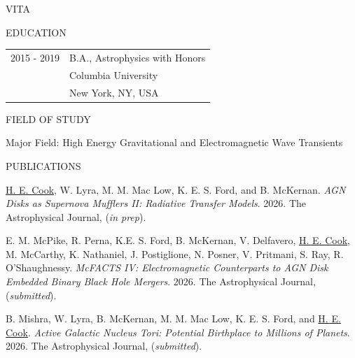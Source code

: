 \begin{center}
 VITA
\end{center}

\medskip

\begin{center}
EDUCATION
\end{center}


\begin{flushleft}
\begin{tabular}{ll}
 
2015 - 2019 &  B.A., Astrophysics with Honors \\
 & Columbia University \\
 & New York, NY, USA
\end{tabular}
\end{flushleft}

\medskip

\singlespace

\medskip

\begin{center}
FIELD OF STUDY
\end{center}
\begin{flushleft}
Major Field: High Energy Gravitational and Electromagnetic Wave Transients
\end{flushleft}

\begin{center}
PUBLICATIONS %
\end{center}

\hangindent=0.5in \noindent \underline{H. E. Cook}, W. Lyra, M. M. Mac Low, K. E. S. Ford, and B. McKernan. \textit{AGN Disks as Supernova Mufflers II: Radiative Transfer Models}. 2026. The Astrophysical Journal, (\textit{in prep}).

\hangindent=0.5in \noindent E. M. McPike, R. Perna, K.E. S. Ford, B. McKernan, V. Delfavero, \underline{H. E. Cook}, M. McCarthy, K. Nathaniel, J. Postiglione, N. Posner, V. Pritmani, S. Ray, R. O'Shaughnessy. \textit{McFACTS IV: Electromagnetic Counterparts to AGN Disk Embedded Binary Black Hole Mergers}. 2026. The Astrophysical Journal, (\textit{submitted}).

\hangindent=0.5in \noindent B. Mishra, W. Lyra, B. McKernan, M. M. Mac Low, K. E. S. Ford, and \underline{H. E. Cook}. \textit{Active Galactic Nucleus Tori: Potential Birthplace to Millions of Planets}. 2026. The Astrophysical Journal, (\textit{submitted}).

